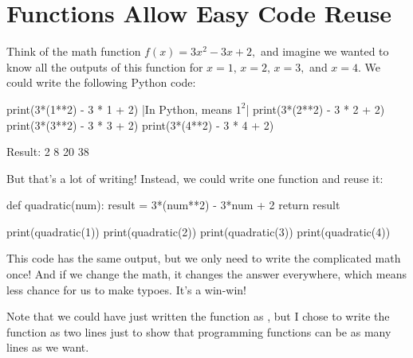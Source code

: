 \documentclass[12pt]{scrartcl}
\begin{document}
\newpage
\section*{Functions Allow Easy Code Reuse}
Think of the math function $f(x) = 3x^2 - 3x + 2,$ and imagine we wanted to know all the outputs of this function for $x = 1,\, x = 2,\, x = 3,$ and $x = 4.$ We could write the following Python code:
\begin{python}
    print(3*(1**2) - 3 * 1 + 2) |\qquad In Python,  means $1^2$|
    print(3*(2**2) - 3 * 2 + 2)
    print(3*(3**2) - 3 * 3 + 2)
    print(3*(4**2) - 3 * 4 + 2)
\end{python}
\begin{code}
    Result:
    2
    8
    20
    38
\end{code}
But that's a lot of writing! Instead, we could write one function and reuse it:
\begin{python}
    def quadratic(num):
        result = 3*(num**2) - 3*num + 2
        return result
    
    print(quadratic(1))
    print(quadratic(2))
    print(quadratic(3))
    print(quadratic(4))
\end{python}
This code has the same output, but we only need to write the complicated math once! And if we change the math, it changes the answer everywhere, which means less chance for us to make typoes. It's a win-win!

Note that we could have just written the function as , but I chose to write the function as two lines just to show that programming functions can be as many lines as we want.
\end{document}
